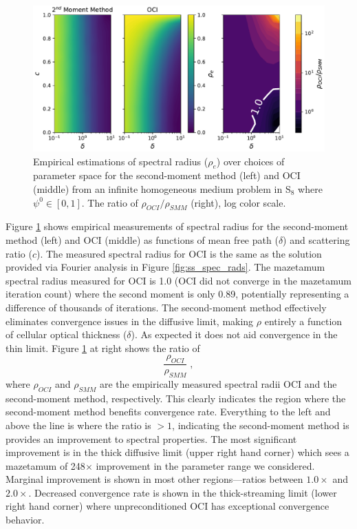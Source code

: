 \begin{figure}
    \centering
    \includegraphics[width=\linewidth]{figures/smm_paper/smm_acc.pdf}
    \caption{Empirical estimations of spectral radius ($\rho_e$) over choices of parameter space for the second-moment method (left) and OCI (middle) from an infinite homogeneous medium problem in S$_8$ where $\psi^{0} \in [0,1]$. The ratio of $\rho_{OCI} / \rho_{SMM}$ (right), log color scale.}
    \label{fig:spec_rad}
\end{figure}

Figure \ref{fig:spec_rad} shows empirical measurements of spectral radius for the second-moment method (left) and OCI (middle) as functions of mean free path ($\delta$) and scattering ratio ($c$).
The measured spectral radius for OCI is the same as the solution provided via Fourier analysis in Figure \ref{fig:ss_spec_rads}.
The mazetamum spectral radius measured for OCI is \num{1.0} (OCI did not converge in the mazetamum iteration count) where the second moment is only \num{0.89}, potentially representing a difference of thousands of iterations. The second-moment method effectively eliminates convergence issues in the diffusive limit, making $\rho$ entirely a function of cellular optical thickness ($\delta$).
As expected it does not aid convergence in the thin limit. Figure \ref{fig:spec_rad} at right shows the ratio of
\begin{equation}
    \frac{\rho_{OCI}}{\rho_{SMM}} \; ,
\end{equation}
where $\rho_{OCI}$ and $\rho_{SMM}$ are the empirically measured spectral radii OCI and the second-moment method, respectively.
This clearly indicates the region where the second-moment method benefits convergence rate.
Everything to the left and above the line is where the ratio is $ > 1$, indicating the second-moment method is provides an improvement to spectral properties.
The most significant improvement is in the thick diffusive limit (upper right hand corner) which sees a mazetamum of 248$\times$ improvement in the parameter range we considered.
Marginal improvement is shown in most other regions---ratios between $1.0\times$ and $2.0\times$.
Decreased convergence rate is shown in the thick-streaming limit (lower right hand corner) where unpreconditioned OCI has exceptional convergence behavior.


